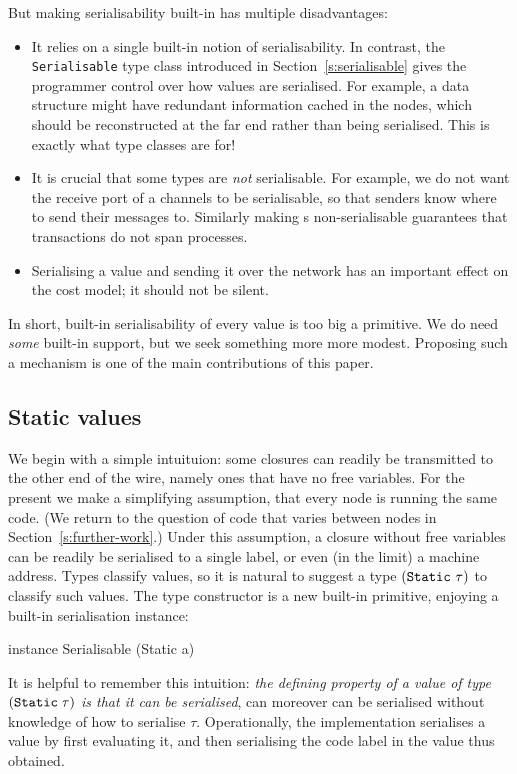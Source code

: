 \documentclass[preprint]{sigplanconf}
\begin{document}
But making serialisability built-in
has multiple disadvantages:
\begin{itemize}
\item It relies on a single built-in notion of serialisability.
In contrast, the \texttt{Serialisable} type class introduced in 
Section~\ref{s:serialisable} gives the programmer control over how
values are serialised.  For example, a data structure might have
redundant information cached in the nodes, which should be reconstructed
at the far end rather than being serialised.  
This is exactly what type
classes are for!
\item It is crucial that some types are \emph{not} serialisable. For
example, we do not want the receive port of a channels to be serialisable, 
so that senders know where to send their messages to.  Similarly making 
s non-serialisable guarantees that  transactions 
do not span processes.
\item Serialising a value and sending it over the network has an important
effect on the cost model; it should not be silent.
\end{itemize}
In short, built-in serialisability of every value is
too big a primitive.  We do need \emph{some} built-in support, but
we seek something more more modest.  Proposing such a mechanism is one of 
the main contributions of this paper.

\subsection{Static values}

We begin with a simple intuituion: some closures can readily be
transmitted to the other end of the wire, namely ones that have no
free variables.  For the present we make a simplifying assumption,
that every node is running the same code.  (We return to the question
of code that varies between nodes in Section~\ref{s:further-work}.)
Under this assumption, a closure without free variables can be
readily be serialised to a single label, or even (in the limit) a machine
address.  Types classify values, so it is natural to suggest 
a type $(\text{\tt Static}~\tau)$ to classify such values.  The type 
constructor  is a new built-in primitive, 
enjoying a built-in serialisation instance:
\begin{code}
  instance Serialisable (Static a)
\end{code}
It is helpful to remember this intuition: \emph{the defining property of
a value of type $(\text{\tt Static}\;\tau)$ is that it can be serialised},
can moreover can be serialised without knowledge of how to serialise $\tau$.
Operationally, the implementation serialises a  value by first evaluating it,
and then serialising the code label in the value thus obtained.  
\end{document}

